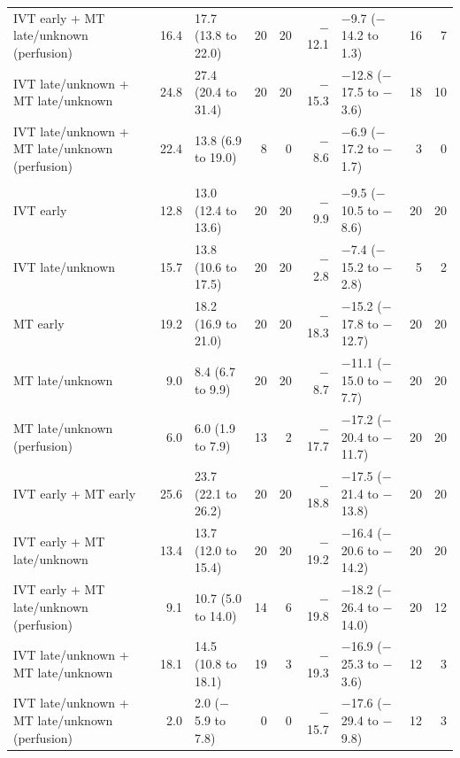 {\begin{longtable}{p{4.3cm}rlrrrlrr}
IVT early + MT late/unknown (perfusion) & 16.4 & 17.7 (13.8 to 22.0) & 20 & 20 & $-$12.1 & $-$9.7 ($-$14.2 to 1.3) & 16 & 7 \\
IVT late/unknown + MT late/unknown & 24.8 & 27.4 (20.4 to 31.4) & 20 & 20 & $-$15.3 & $-$12.8 ($-$17.5 to $-$3.6) & 18 & 10 \\
IVT late/unknown + MT late/unknown (perfusion) & 22.4 & 13.8 (6.9 to 19.0) & 8 & 0 & $-$8.6 & $-$6.9 ($-$17.2 to $-$1.7) & 3 & 0 \\
\addlinespace
\multicolumn{9}{l}{\textbf{NIHSS 21--25}}\\
IVT early & 12.8 & 13.0 (12.4 to 13.6) & 20 & 20 & $-$9.9 & $-$9.5 ($-$10.5 to $-$8.6) & 20 & 20 \\
IVT late/unknown & 15.7 & 13.8 (10.6 to 17.5) & 20 & 20 & $-$2.8 & $-$7.4 ($-$15.2 to $-$2.8) & 5 & 2 \\
MT early & 19.2 & 18.2 (16.9 to 21.0) & 20 & 20 & $-$18.3 & $-$15.2 ($-$17.8 to $-$12.7) & 20 & 20 \\
MT late/unknown & 9.0 & 8.4 (6.7 to 9.9) & 20 & 20 & $-$8.7 & $-$11.1 ($-$15.0 to $-$7.7) & 20 & 20 \\
MT late/unknown (perfusion) & 6.0 & 6.0 (1.9 to 7.9) & 13 & 2 & $-$17.7 & $-$17.2 ($-$20.4 to $-$11.7) & 20 & 20 \\
IVT early + MT early & 25.6 & 23.7 (22.1 to 26.2) & 20 & 20 & $-$18.8 & $-$17.5 ($-$21.4 to $-$13.8) & 20 & 20 \\
IVT early + MT late/unknown & 13.4 & 13.7 (12.0 to 15.4) & 20 & 20 & $-$19.2 & $-$16.4 ($-$20.6 to $-$14.2) & 20 & 20 \\
IVT early + MT late/unknown (perfusion) & 9.1 & 10.7 (5.0 to 14.0) & 14 & 6 & $-$19.8 & $-$18.2 ($-$26.4 to $-$14.0) & 20 & 12 \\
IVT late/unknown + MT late/unknown & 18.1 & 14.5 (10.8 to 18.1) & 19 & 3 & $-$19.3 & $-$16.9 ($-$25.3 to $-$3.6) & 12 & 3 \\
IVT late/unknown + MT late/unknown (perfusion) & 2.0 & 2.0 ($-$5.9 to 7.8) & 0 & 0 & $-$15.7 & $-$17.6 ($-$29.4 to $-$9.8) & 12 & 3 \\
\end{longtable}
\vspace{-0.5\baselineskip}
}

